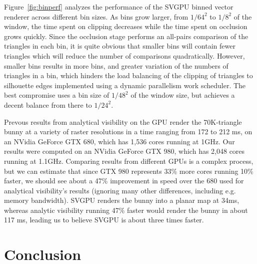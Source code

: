 \documentclass[review]{acmsiggraph}
\begin{document}
Figure~\ref{fig:binperf} analyzes the performance of the SVGPU binned vector
renderer across different bin sizes. As bins grow larger, from $1/64^2$ to
$1/8^2$ of the window, the time spent on clipping decreases while the time
spent on occlusion grows quickly. Since the occlusion stage performs an
all-pairs comparison of the triangles in each bin, it is quite obvious that
smaller bins will contain fewer triangles which will reduce the number of
comparisons quadratically. However, smaller bins results in more bins, and
greater variation of the numbers of triangles in a bin, which hinders the load
balancing of the clipping of triangles to silhouette edges implemented using a
dynamic parallelism work scheduler. The best compromise uses a bin size of
$1/48^2$ of the window size, but achieves a decent balance from there to
$1/24^2.$

Prevous results from analytical visibility on the GPU \cite{auzinger2013}
render the 70K-triangle bunny at a variety of raster resolutions in a time
ranging from 172 to 212 ms, on an NVidia GeForce GTX 680, which has 1,536
cores running at 1GHz. Our results were computed on an NVidia GeForce GTX 980,
which has 2,048 cores running at 1.1GHz. Comparing results from different
GPUs is a complex process, but we can estimate that since GTX 980 represents
33\% more cores running 10\% faster, we should see about a 47\% improvement in
speed over the 680 used for analytical visibility's results (ignoring many
other differences, including e.g. memory bandwidth). SVGPU renders the
bunny into a planar map at 34ms, whereas analytic visibility running 47\%
faster would render the bunny in about 117 ms, leading us to believe SVGPU is
about three times faster.
 
\section{Conclusion}
\end{document}
